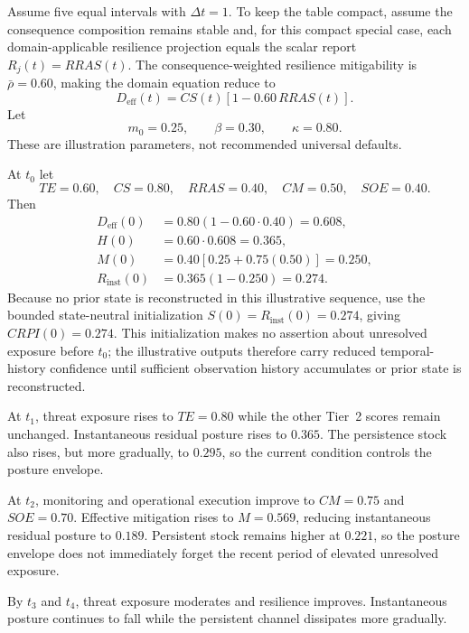 \documentclass[11pt]{article}
\begin{document}
Assume five equal intervals with $\Delta t=1$. To keep the table compact, assume the
consequence composition remains stable and, for this compact special case, each
domain-applicable resilience projection equals the scalar report
$R_j(t)=RRAS(t)$. The consequence-weighted resilience mitigability is
$\bar\rho=0.60$, making the domain equation reduce to
\begin{equation}
  D_{\mathrm{eff}}(t)=CS(t)\left[1-0.60\,RRAS(t)\right].
\end{equation}
Let
\begin{equation}
  m_0=0.25,\qquad \beta=0.30,\qquad \kappa=0.80.
\end{equation}
These are illustration parameters, not recommended universal defaults.

At $t_0$ let
\begin{equation}
  TE=0.60,\quad CS=0.80,\quad RRAS=0.40,\quad CM=0.50,\quad SOE=0.40.
\end{equation}
Then
\begin{align}
  D_{\mathrm{eff}}(0) &=0.80(1-0.60\cdot0.40)=0.608,\\
  H(0)&=0.60\cdot0.608=0.365,\\
  M(0)&=0.40[0.25+0.75(0.50)]=0.250,\\
  R_{\mathrm{inst}}(0)&=0.365(1-0.250)=0.274.
\end{align}
Because no prior state is reconstructed in this illustrative sequence, use the bounded
state-neutral initialization $S(0)=R_{\mathrm{inst}}(0)=0.274$, giving $CRPI(0)=0.274$.
This initialization makes no assertion about unresolved exposure before $t_0$; the
illustrative outputs therefore carry reduced temporal-history confidence until
sufficient observation history accumulates or prior state is reconstructed.

At $t_1$, threat exposure rises to $TE=0.80$ while the other Tier~2 scores remain
unchanged. Instantaneous residual posture rises to $0.365$. The persistence stock also
rises, but more gradually, to $0.295$, so the current condition controls the posture
envelope.

At $t_2$, monitoring and operational execution improve to $CM=0.75$ and $SOE=0.70$.
Effective mitigation rises to $M=0.569$, reducing instantaneous residual posture to
$0.189$. Persistent stock remains higher at $0.221$, so the posture envelope does not
immediately forget the recent period of elevated unresolved exposure.

By $t_3$ and $t_4$, threat exposure moderates and resilience improves. Instantaneous
posture continues to fall while the persistent channel dissipates more gradually.
\end{document}
